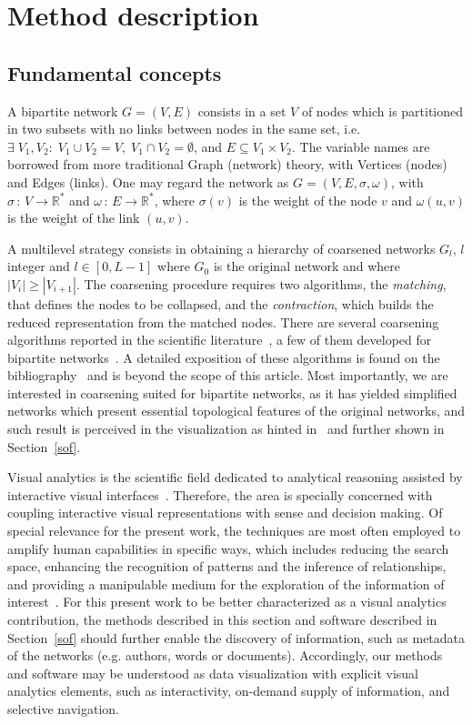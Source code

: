 \documentclass[runningheads]{llncs}
\begin{document}
\section{Method description}\label{des}
\subsection{Fundamental concepts}\label{bac}
A bipartite network $G=(V,E)$ consists in a set $V$ of nodes which is partitioned in two subsets
with no links between nodes in the same set, i.e. $\exists\; V_1, V_2:\; V_1\cup V_2 = V,\;V_1\cap V_2 = \emptyset$, and $E\subseteq V_1 \times V_2$.
The variable names are borrowed from more traditional
Graph (network) theory, with Vertices (nodes) and Edges (links).
One may regard the network as $G=(V,E,\sigma,\omega)$, with
$\sigma\,:\,V\rightarrow \mathbb{R}^*$ and $\omega\,:\,E \rightarrow \mathbb{R}^*$,
where $\sigma(v)$ is the weight of the node $v$ and
$\omega(u,v)$ is the weight of the link $(u,v)$.

A multilevel strategy consists in obtaining a hierarchy of coarsened networks $G_l$, $l$ integer and $l \in [0,L-1]$ where $G_0$ is the original network
and where $|V_i| \geq |V_{i+1}|$.
The coarsening procedure requires two algorithms, the \emph{matching}, that defines the nodes to be collapsed, and the \emph{contraction}, which builds the reduced representation
from the matched nodes.
There are several coarsening algorithms reported in the scientific literature~\cite{}, a few of them
developed for bipartite networks~\cite{}.
A detailed exposition of these algorithms is found on the bibliography~\cite{} and is beyond the scope of this article.
Most importantly, we are interested in coarsening suited for bipartite networks,
as it has yielded simplified networks which present essential topological features
of the original networks,
and such result is perceived in the visualization as hinted in~\cite{alan2} and further shown in
Section~\ref{sof}.

Visual analytics is the scientific field dedicated to analytical reasoning assisted by interactive visual interfaces~\cite{}.
Therefore, the area is specially concerned with coupling interactive visual representations with sense and decision making.
Of special relevance for the present work, the techniques are most often employed to amplify human capabilities in specific ways,
which includes reducing the search space, enhancing the recognition of patterns and the inference of relationships,
and providing a manipulable medium for the exploration of the information of interest~\cite{}.
For this present work to be better characterized as a visual analytics contribution, the methods described in this section and software described in Section~\ref{sof} should further enable the discovery of information, such as metadata of the networks (e.g. authors, words or documents).
Accordingly, our methods and software may be understood as data visualization with explicit visual analytics elements, such as interactivity, on-demand supply of information, and selective navigation.
\end{document}
